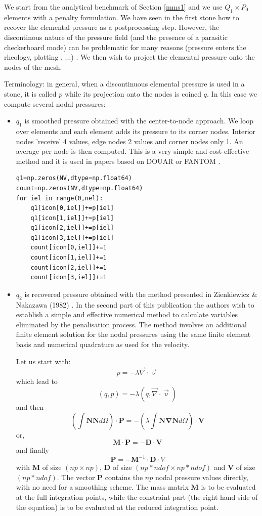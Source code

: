 We start from the analytical benchmark of Section \ref{mms1} and we use $Q_1 \times P_0$
elements with a penalty formulation. 
We have seen in the first stone how to recover the elemental pressure as a postprocessing step. 
However, the discontinous nature of the pressure field (and the presence of a
parasitic checkerboard mode) can be problematic for many reasons 
(pressure enters the rheology, plotting , ...) . 
We then wish to project the elemental pressure onto the nodes of the mesh. 

Terminology: in general, when a discontinuous elemental pressure is used in a stone, 
it is called $p$ while its projection onto the nodes is coined $q$. 
In this case we compute several nodal pressures:
\begin{itemize}
\item $q_1$ is smoothed pressure obtained with the  center-to-node approach. We loop 
over  elements and each element adds its pressure to its corner nodes. Interior nodes 
'receive' 4 values, edge nodes 2 values and corner nodes only 1. An average per node
is then computed. This is a very simple and cost-effective method and it is used in 
papers based on DOUAR or FANTOM \cite{brtf08,thfb08,thie11}.

\begin{lstlisting}
q1=np.zeros(NV,dtype=np.float64)  
count=np.zeros(NV,dtype=np.float64)  
for iel in range(0,nel):
    q1[icon[0,iel]]+=p[iel]
    q1[icon[1,iel]]+=p[iel]
    q1[icon[2,iel]]+=p[iel]
    q1[icon[3,iel]]+=p[iel]
    count[icon[0,iel]]+=1
    count[icon[1,iel]]+=1
    count[icon[2,iel]]+=1
    count[icon[3,iel]]+=1
\end{lstlisting}

\item $q_2$ is recovered pressure obtained with the method presented 
in Zienkiewicz \& Nakazawa (1982) \cite{zina82}. In the second part 
of this publication the authors wish to establish a simple and effective numerical method to calculate 
variables eliminated by the penalisation process. 
The method involves an additional finite element solution for the nodal pressures using 
the same finite element basis and numerical quadrature as used for the velocity.

Let us start with:
\[
p = -\lambda \vec\nabla\cdot \vec\upnu
\]
which lead to
\[
(q,p)=-\lambda (q,{\vec \nabla}\cdot{\vec \upnu})
\]
and then
\[
\left( \int {\bm N} {\bm N} d\Omega \right) \cdot {\bm P} = - \left( \lambda \int {\bm N} {\bm \nabla}{\bm N} d\Omega \right)\cdot{\bm V}
\]
or, 
\[
{\bm M} \cdot {\bm P} = - {\bm D}\cdot{\bm V}
\]
and finally
\[
{\bm P} = -{\bm M}^{-1} \cdot {\bm D} \cdot {V}
\]
with ${\bm M}$ of size $(np\times np)$, ${\bm D}$ of size $(np*ndof\times np*ndof)$ and ${\bm V}$ of size $(np*ndof)$.
The vector ${\bm P}$ contains the $np$ nodal pressure values directly, with no need for a smoothing scheme. 
The mass matrix ${\bm M}$ is to be evaluated at the full integration points, while the constraint part (the right
hand side of the equation) is to be evaluated at the reduced integration point. 


\end{itemize}
